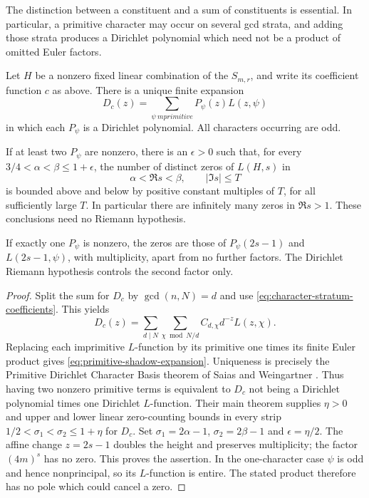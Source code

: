 The distinction between a constituent and a sum of constituents is essential.
In particular, a primitive character may occur on several gcd strata, and
adding those strata produces a Dirichlet polynomial which need not be a
product of omitted Euler factors.

\begin{theorem}\label{thm:shadow-zero-classification}
Let $H$ be a nonzero fixed linear combination of the $S_{m,r}$, and write its
coefficient function $c$ as above.  There is a unique finite expansion
\begin{equation}\label{eq:primitive-shadow-expansion}
 D_c(z)=\sum_{\psi\ {
m primitive}}P_\psi(z)L(z,\psi)
\end{equation}
in which each $P_\psi$ is a Dirichlet polynomial.  All characters occurring
are odd.

If at least two $P_\psi$ are nonzero, there is an $\epsilon>0$ such that,
for every $3/4<\alpha<\beta\leq1+\epsilon$, the number of distinct zeros of
$L(H,s)$ in
\[
 \alpha<\Re s<\beta,\qquad |\Im s|\leq T
\]
is bounded above and below by positive constant multiples of $T$, for all
sufficiently large $T$.  In particular there are infinitely many zeros in
$\Re s>1$.  These conclusions need no Riemann hypothesis.

If exactly one $P_\psi$ is nonzero, the zeros are those of
$P_\psi(2s-1)$ and $L(2s-1,\psi)$, with multiplicity, apart from no further
factors.  The Dirichlet Riemann hypothesis controls the second factor only.
\end{theorem}
\begin{proof}
Split the sum for $D_c$ by $\gcd(n,N)=d$ and use
\eqref{eq:character-stratum-coefficients}.  This yields
\[
 D_c(z)=\sum_{d\mid N}\sum_{\chi\bmod N/d}
 C_{d,\chi}d^{-z}L(z,\chi).
\]
Replacing each imprimitive $L$-function by its primitive one times its finite
Euler product gives \eqref{eq:primitive-shadow-expansion}.
Uniqueness is precisely the Primitive Dirichlet Character Basis theorem of
Saias and Weingartner \cite[p.~335]{SW2009}.  Thus having two nonzero
primitive terms is equivalent to $D_c$ not being a Dirichlet polynomial times
one Dirichlet $L$-function.  Their main theorem
\cite[pp.~335--336]{SW2009} supplies $\eta>0$ and upper and lower linear
zero-counting bounds in every strip
$1/2<\sigma_1<\sigma_2\leq1+\eta$ for $D_c$.
Set $\sigma_1=2\alpha-1$, $\sigma_2=2\beta-1$ and
$\epsilon=\eta/2$.  The affine change $z=2s-1$ doubles the height and
preserves multiplicity; the factor $(4m)^s$ has no zero.  This proves the
assertion.  In the one-character case $\psi$ is odd and hence nonprincipal,
so its $L$-function is entire.  The stated product therefore has no pole
which could cancel a zero.
\end{proof}

